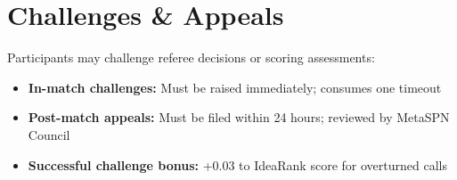\section{Challenges \& Appeals}

Participants may challenge referee decisions or scoring assessments:

\begin{itemize}[leftmargin=*]
  \item \textbf{In-match challenges:} Must be raised immediately; consumes one timeout
  \item \textbf{Post-match appeals:} Must be filed within 24 hours; reviewed by MetaSPN Council
  \item \textbf{Successful challenge bonus:} +0.03 to IdeaRank score for overturned calls
\end{itemize}

